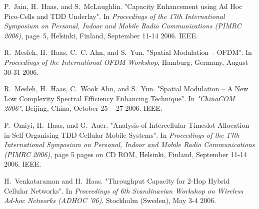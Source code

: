 \begin{bibunit}[hplain]
\begin{thebibliography}{1}
P.~Jain, H.~Haas, and S.~McLaughlin.
\newblock "{Capacity Enhancement using Ad Hoc Pico-Cells and TDD Underlay}".
\newblock In {\em Proceedings of the 17th International Symposium on Personal,
  Indoor and Mobile Radio Communications ({PIMRC} 2006)}, page~5, Helsinki,
  Finland, September 11-14 2006. IEEE.

R.~Mesleh, H.~Haas, C.~C. Ahn, and S.~Yun.
\newblock "{Spatial Modulation -- OFDM}".
\newblock In {\em Proceedings of the International {OFDM} Workshop}, Hamburg,
  Germany, August 30-31 2006.

R.~Mesleh, H.~Haas, C.~Wook Ahn, and S.~Yun.
\newblock "{Spatial Modulation -- A New Low Complexity Spectral Efficiency
  Enhancing Technique}".
\newblock In {\em "{ChinaCOM 2006}"}, Beijing, China, October 25 -- 27 2006.
  IEEE.

P.~Omiyi, H.~Haas, and G.~Auer.
\newblock "{Analysis of Intercellular Timeslot Allocation in Self-Organising
  TDD Cellular Mobile Systems}".
\newblock In {\em Proceedings of the 17th International Symposium on Personal,
  Indoor and Mobile Radio Communications ({PIMRC} 2006)}, page 5 pages on CD
  ROM, Helsinki, Finland, September 11-14 2006. IEEE.

H.~Venkataraman and H.~Haas.
\newblock "{Throughput Capacity for 2-Hop Hybrid Cellular Networks}".
\newblock In {\em Proceedings of 6th Scandinavian Workshop on Wireless Ad-hoc
  Networks ({ADHOC} '06)}, Stockholm (Sweden), May 3-4 2006.

\end{thebibliography}
\end{bibunit} 